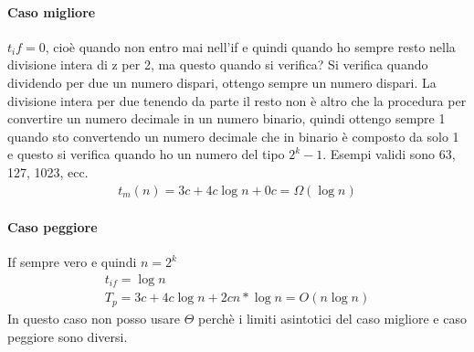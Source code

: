 \paragraph*{Caso migliore} $t_if = 0$, cioè quando non entro mai nell'if e quindi quando ho
sempre resto nella divisione intera di z per 2, ma questo quando si verifica? Si verifica quando
dividendo per due un numero dispari, ottengo sempre un numero dispari. La divisione intera per due tenendo
da parte il resto non è altro che la procedura per convertire un numero decimale in un numero binario, quindi
ottengo sempre 1 quando sto convertendo un numero decimale che in binario è composto da solo 1 e questo si verifica
quando ho un numero del tipo $2^k - 1$. Esempi validi sono 63, 127, 1023, ecc.\\
\begin{align*}
    t_m(n)=3c+4c \log n + 0c = \Omega(\log n)
\end{align*}
\paragraph*{Caso peggiore} If sempre vero e quindi $n=2^k$
\begin{align*}
    t_{if}=\log n\\
    T_p=3c+4c\log n + 2cn*\log n = O(n\log n)
\end{align*}
In questo caso non posso usare $\Theta$ perchè i limiti asintotici del caso migliore e caso
peggiore sono diversi.